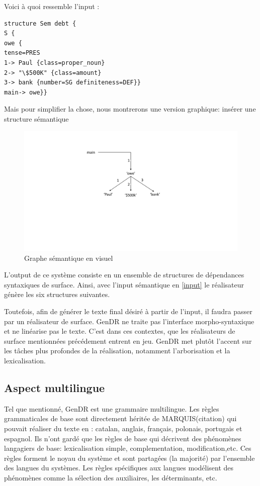 Voici à quoi ressemble l'input :
\begin{lstlisting}[language=XML, caption = Input sémantique, label=input]
structure Sem debt {
S {
owe {
tense=PRES
1-> Paul {class=proper_noun}
2-> "\$500K" {class=amount}
3-> bank {number=SG definiteness=DEF}}
main-> owe}}
\end{lstlisting}

Mais pour simplifier la chose, nous montrerons une version graphique: insérer une structure sémantique
\begin{figure}[htb]
	\centering
	\includegraphics[width=1\textwidth, trim = {0cm 0cm 0cm 0cm},clip]{ch3/figs/owe_sem.pdf}
	\caption{Graphe sémantique en visuel}
	\label{fig:graphesem}
\end{figure}

L'output de ce système consiste en un ensemble de structures de dépendances syntaxiques de surface. Ainsi, avec l'input sémantique en \ref{input} le réalisateur génère les six structures suivantes. 


Toutefois, afin de générer le texte final désiré à partir de l'input, il faudra passer par un réalisateur de surface. GenDR ne traite pas l'interface morpho-syntaxique et ne linéarise pas le texte. C'est dans ces contextes, que les réalisateurs de surface mentionnées précédement entrent en jeu. GenDR met plutôt l'accent sur les tâches plus profondes de la réalisation, notamment l'arborisation et la lexicalisation.

\subsection{Aspect multilingue}
Tel que mentionné, GenDR est une grammaire multilingue. Les règles grammaticales de base sont directement héritée de MARQUIS(citation) qui pouvait réaliser du texte en : catalan, anglais, français, polonais, portugais et espagnol. Ils n'ont gardé que les règles de base qui décrivent des phénomènes langagiers de base: lexicalisation simple, complementation, modification,etc. Ces règles forment le noyau du système et sont partagées (la majorité) par l'ensemble des langues du systèmes. Les règles spécifiques aux langues modélisent des phénomènes comme la sélection des auxiliaires, les déterminants, etc.


